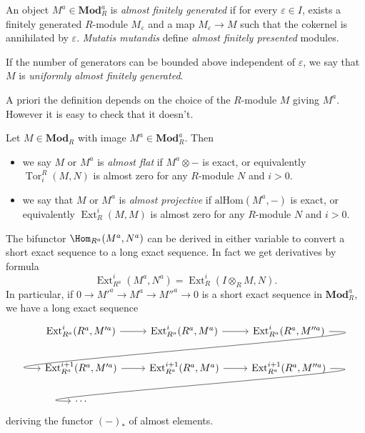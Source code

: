 \documentclass[a4paper]{article}
\renewcommand{\c}[1]{\mathbf{#1}}
\newcommand{\Mod}{{\c{Mod}}}
\DeclareMathOperator{\Tor}{Tor} %
\DeclareMathOperator{\Ext}{Ext} %
\begin{document}
\begin{definition}
  An object \(M^a \in \Mod_R^a\) is \emph{almost finitely generated} if for every \(\varepsilon \in I\), exists a finitely generated \(R\)-module \(M_\varepsilon\) and a map \(M_\varepsilon \to M\) such that the cokernel is annihilated by \(\varepsilon\). \emph{Mutatis mutandis} define \emph{almost finitely presented} modules.

  If the number of generators can be bounded above independent of \(\varepsilon\), we say that \(M\) is \emph{uniformly almost finitely generated}.
\end{definition}

\begin{remark}
  A priori the definition depends on the choice of the \(R\)-module \(M\) giving \(M^a\). However it is easy to check that it doesn't.
\end{remark}

\begin{definition}
  Let \(M \in \Mod_R\) with image \(M^a \in \Mod_R^a\). Then
  \begin{itemize}
  \item we say \(M\) or \(M^a\) is \emph{almost flat} if \(M^a \otimes -\) is exact, or equivalently \(\Tor^R_i(M, N)\) is almost zero for any \(R\)-module \(N\) and \(i > 0\).
  \item we say that \(M\) or \(M^a\) is \emph{almost projective} if \(\mathrm{alHom}(M^a, -)\) is exact, or equivalently \(\Ext^i_R(M, M)\) is almost zero for any \(R\)-module \(N\) and \(i > 0\).
  \end{itemize}
\end{definition}

\begin{ex}
  The bifunctor \(\Hom_{R^a}(M^a, N^a)\) can be derived in either variable to convert a short exact sequence to a long exact sequence. In fact we get derivatives by formula
  \[
    \Ext_{R^a}^i(M^a, N^a) = \Ext_R^i(I \otimes_R M, N).
  \]
  In particular, if \(0 \to M'^a \to M^a \to M''^a \to 0\) is a short exact sequence in \(\Mod_R^a\), we have a long exact sequence
  \[
    \begin{tikzcd}
      \Ext_{R^a}^i(R^a, M'^a) \ar[r] & \Ext_{R^a}^i(R^a, M^a) \ar[r] & \Ext_{R^a}^i(R^a, M''^a) \ar[dll, out=0, in=180, overlay] \\
      \Ext_{R^a}^{i + 1}(R^a, M'^a) \ar[r] & \Ext_{R^a}^{i + 1}(R^a, M^a) \ar[r] & \Ext_{R^a}^{i + 1} (R^a, M''^a) \ar[dll, out=0, in=180, overlay] \\
      \cdots 
    \end{tikzcd}
  \]
  deriving the functor \((-)_*\) of almost elements.
\end{ex}
\end{document}
